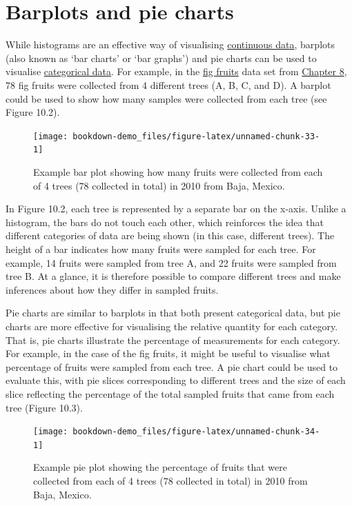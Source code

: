 \documentclass[
]{scrbook}
\begin{document}
\hypertarget{barplots-and-pie-charts}{%
\section{Barplots and pie charts}\label{barplots-and-pie-charts}}

While histograms are an effective way of visualising \protect\hyperlink{Chapter_5}{continuous data}, barplots (also known as `bar charts' or `bar graphs') and pie charts can be used to visualise \protect\hyperlink{Chapter_5}{categorical data}.
For example, in the \href{https://raw.githubusercontent.com/bradduthie/statistical_techniques/main/data/fig_fruits.csv}{fig fruits} data set from \protect\hyperlink{Chapter_8}{Chapter 8}, 78 fig fruits were collected from 4 different trees (A, B, C, and D).
A barplot could be used to show how many samples were collected from each tree (see Figure 10.2).

\begin{figure}
\texttt{[image: bookdown-demo\_files/figure-latex/unnamed-chunk-33-1]} \caption{Example bar plot showing how many fruits were collected from each of 4 trees (78 collected in total) in 2010 from Baja, Mexico.}\label{fig:unnamed-chunk-33}
\end{figure}

In Figure 10.2, each tree is represented by a separate bar on the x-axis.
Unlike a histogram, the bars do not touch each other, which reinforces the idea that different categories of data are being shown (in this case, different trees).
The height of a bar indicates how many fruits were sampled for each tree.
For example, 14 fruits were sampled from tree A, and 22 fruits were sampled from tree B.
At a glance, it is therefore possible to compare different trees and make inferences about how they differ in sampled fruits.

Pie charts are similar to barplots in that both present categorical data, but pie charts are more effective for visualising the relative quantity for each category.
That is, pie charts illustrate the percentage of measurements for each category.
For example, in the case of the fig fruits, it might be useful to visualise what percentage of fruits were sampled from each tree.
A pie chart could be used to evaluate this, with pie slices corresponding to different trees and the size of each slice reflecting the percentage of the total sampled fruits that came from each tree (Figure 10.3).

\begin{figure}
\texttt{[image: bookdown-demo\_files/figure-latex/unnamed-chunk-34-1]} \caption{Example pie plot showing the percentage of fruits that were collected from each of 4 trees (78 collected in total) in 2010 from Baja, Mexico.}\label{fig:unnamed-chunk-34}
\end{figure}
\end{document}
